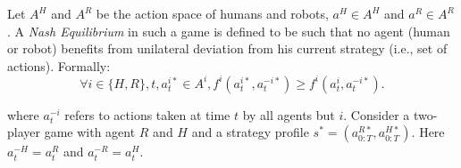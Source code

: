 \documentclass[letterpaper, 10 pt, conference]{ieeeconf}  %
\begin{document}
Let $A^H$ and $ A^R$ be the action space of humans and robots, $a^H \in A^H$ 
and $a^R \in A^R$. A \textit{Nash Equilibrium} in such a game is defined to be such that 
no agent (human or robot) benefits from unilateral deviation from his current 
strategy (i.e., set of actions). Formally:
\begin{equation}
	\forall i \in \{H,R\}, t,a^{i*}_t \in A^i, f^i(a^{i*}_t,a^{-i*}_t) \geq f^i(a^{i}_t,a^{-i*}_t). 
\end{equation}

where $a^{-i}_t$ refers to actions taken at time $t$ by all agents but $i$.
Consider a two-player game with agent $R$ and $H$ and a strategy profile $s^* = (a^{R*}_{0:T},a^{H*}_{0:T})$. Here $a_t^{-H} = a_t^R$ and $a_t^{-R} = a_t^H$. 

 

\end{document}
